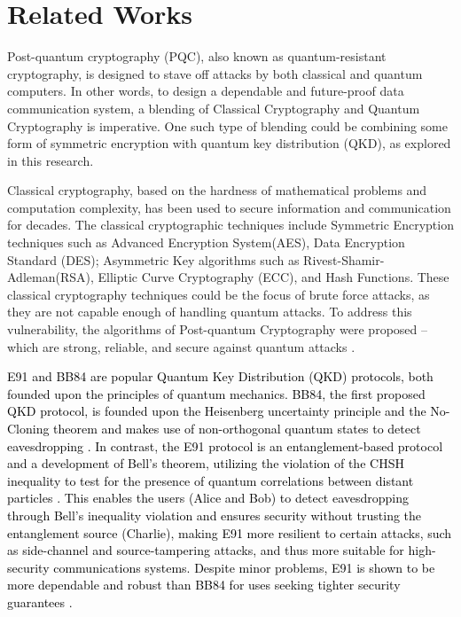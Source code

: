 \documentclass[a4paper]{cas-sc}
\begin{document}
\section{Related Works}
\label{sec:relatedWorks}
Post-quantum cryptography (PQC), also known as quantum-resistant cryptography, is designed to stave off attacks
by both classical and quantum computers. In other words, to design a dependable and future-proof data communication
system, a blending of Classical Cryptography and Quantum Cryptography is imperative. One such type of blending
could be combining some form of symmetric encryption with quantum key distribution (QKD), as explored in this research.

Classical cryptography, based on the hardness of mathematical problems and computation complexity, has been used to secure information and communication for decades. The classical cryptographic techniques include Symmetric Encryption techniques such as Advanced Encryption System(AES), Data Encryption Standard (DES); Asymmetric Key algorithms such as Rivest-Shamir-Adleman(RSA), Elliptic Curve Cryptography (ECC), and Hash Functions. These classical cryptography techniques could be the focus of brute force attacks, as they are not capable enough of handling quantum attacks. To address this vulnerability, the algorithms of Post-quantum Cryptography were proposed -- which are strong, reliable, and secure against quantum attacks \cite{sharma2023post}.

\textcolor{black}{E91 and BB84 are popular Quantum Key Distribution (QKD) protocols, both founded upon the principles of quantum mechanics. BB84, the first proposed QKD protocol, is founded upon the Heisenberg uncertainty principle and the No-Cloning theorem and makes use of non-orthogonal quantum states to detect eavesdropping \cite{bennett2014quantum}. In contrast, the E91 protocol is an entanglement-based protocol and a development of Bell's theorem, utilizing the violation of the CHSH inequality to test for the presence of quantum correlations between distant particles \cite{Ekert1991}. This enables the users (Alice and Bob) to detect eavesdropping through Bell's inequality violation and ensures security without trusting the entanglement source (Charlie), making E91 more resilient to certain attacks, such as side-channel and source-tampering attacks, and thus more suitable for high-security communications systems. Despite minor problems, E91 is shown to be more dependable and robust than BB84 for uses seeking tighter security guarantees \cite{alvarez2016comparison}.}
\end{document}
